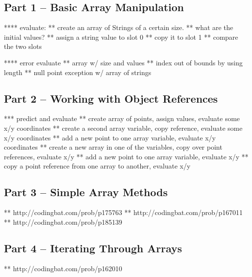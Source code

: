 \subsection{Part 1 -- Basic Array Manipulation}

**** evaluate:
** create an array of Strings of a certain size. 
** what are the initial values?
** assign a string value to slot 0
** copy it to slot 1
** compare the two slots

**** error evaluate
** array w/ size and values
** index out of bounds by using length
** null point exception w/ array of strings

\initialbox

\subsection{Part 2 -- Working with Object References}
*** predict and evaluate
** create array of points, assign values, evaluate some x/y coordinates
** create a second array variable, copy reference, evaluate some x/y coordinates
** add a new point to one array variable, evaluate x/y coordinates
** create a new array in one of the variables, copy over point references, evaluate x/y
** add a new point to one array variable, evaluate x/y
** copy a point reference from one array to another, evaluate x/y

\initialbox


\subsection{Part 3 -- Simple Array Methods}
** http://codingbat.com/prob/p175763
** http://codingbat.com/prob/p167011
** http://codingbat.com/prob/p185139

\initialbox
\subsection{Part 4 -- Iterating Through Arrays}
** http://codingbat.com/prob/p162010

\initialbox
